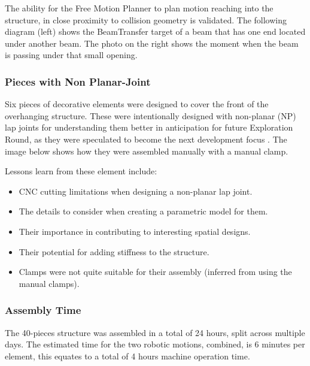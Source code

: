 The ability for the Free Motion Planner to plan motion reaching into the structure, in close proximity to collision geometry is validated. The following diagram (left) shows the BeamTransfer target of a beam that has one end located under another beam. The photo on the right shows the moment when the beam is passing under that small opening. 


\subsubsection{Pieces with Non Planar-Joint}
\label{subsubsection:exploration-2-pieces-with-non-planar-joint}

Six pieces of decorative elements were designed to cover the front of the overhanging structure. These were intentionally designed with non-planar (NP) lap joints for understanding them better in anticipation for future Exploration Round, as they were speculated to become the next development focus . The image below shows how they were assembled manually with a manual clamp. 

Lessons learn from these element include:
\begin{itemize}
    \item CNC cutting limitations when designing a non-planar lap joint. 
    \item The details to consider when creating a parametric model for them. 
    \item Their importance in contributing to interesting spatial designs. 
    \item Their potential for adding stiffness to the structure.
    \item Clamps were not quite suitable for their assembly (inferred from using the manual clamps).
\end{itemize}

\subsubsection{Assembly Time}
\label{subsubsection:exploration-2-assembly-time}

The 40-pieces structure was assembled in a total of 24 hours, split across multiple days. The estimated time for the two robotic motions, combined, is 6 minutes per element, this equates to a total of 4 hours machine operation time. 

